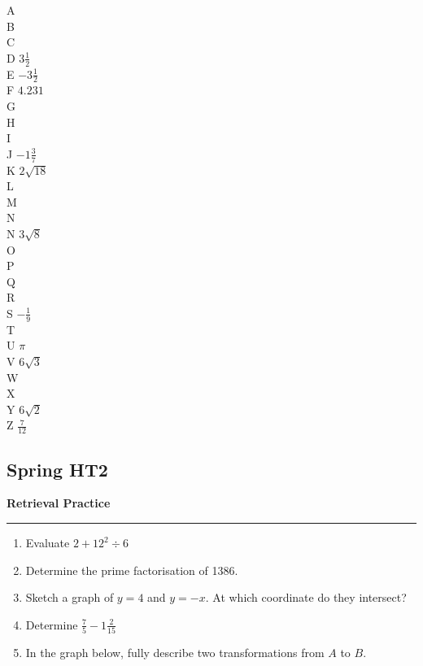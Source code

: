 \documentclass[12pt]{article}
\begin{document}
\newpage

\noindent A \\
B  \\
C  \\
D \quad \(3\frac{1}{2}\)\\
E \quad \(-3\frac{1}{2}\)\\
F \quad \(4.231\)\\
G \\
H  \\
I  \\
J \quad \(-1\frac{3}{7}\)\\
K \quad \(2\sqrt{18}\)\\
L \\ 
M  \\ 
N \\
N \quad \(3\sqrt{8}\)\\
O \\
P \\
Q \\
R \\
S \quad \(-\frac{1}{9}\)\\
T  \\
U \quad \(\pi\)\\
V \quad \(6\sqrt{3}\)\\
W \\
X \\
Y \quad \(6\sqrt{2}\)\\
Z \quad \(\frac{7}{12}\)\\


\newpage

\subsection{Spring HT2}

\newpage

\noindent \textbf{Retrieval Practice}

\medskip

\hrule

\medskip

\begin{enumerate}
    \item Evaluate \(2+12^2\div6 \)
    \item Determine the prime factorisation of 1386.
    \item Sketch a graph of \(y=4\) and \(y=-x\). At which coordinate do they intersect?
    \item Determine \(\frac{7}{5}-1\frac{2}{15}\)
    \item In the graph below, fully describe two transformations from \(A\) to \(B\).
\end{enumerate}
\end{document}
